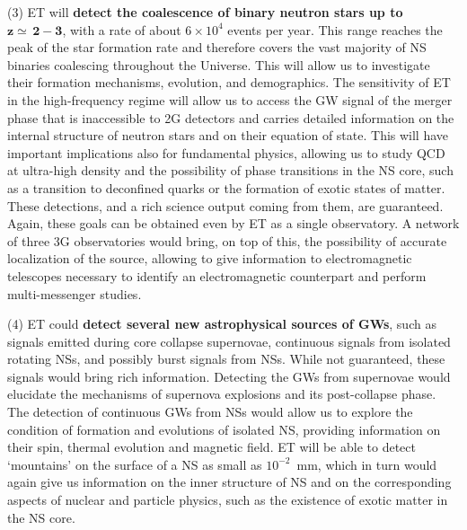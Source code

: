 (3) ET will \textbf{detect the coalescence of binary neutron stars up to} $\mathbf{z\simeq\,2-3}$, with a rate of about $6\times 10^4$ events per year. This range  reaches the peak of the star formation rate and therefore covers the vast majority of NS binaries coalescing throughout the Universe. This will allow us to investigate their formation mechanisms, evolution, and demographics. The sensitivity of ET in the high-frequency regime will allow us to access the GW signal of the merger phase that is inaccessible to 2G detectors and carries detailed information on the internal structure of neutron stars and on their equation of state. This will have  important implications also for fundamental physics, allowing us to study QCD at ultra-high density and  the possibility of phase transitions in the NS core, such as a transition to deconfined quarks or the formation of exotic states of matter. These detections, and a rich science output coming from them, are guaranteed. Again, these goals can be obtained even by ET as a single observatory. A network of three 3G observatories would bring, on top of this, the possibility of accurate localization of the source, allowing to give information to electromagnetic telescopes necessary to identify an electromagnetic counterpart and perform multi-messenger studies.

(4) ET  could \textbf{detect several new astrophysical sources of GWs}, such as signals
emitted during core collapse supernovae, continuous signals from isolated rotating NSs, and possibly burst signals from NSs. While not guaranteed, these signals would bring rich information. Detecting the GWs from supernovae would elucidate the mechanisms of supernova explosions and its post-collapse phase.
The detection of continuous GWs from NSs would allow us to explore the condition of formation and evolutions of isolated NS, providing information on their spin, thermal evolution and magnetic field. ET will be able to detect `mountains' on the surface of a NS as small as $10^{-2}$~mm, which in turn would again give us information on the inner structure of NS and on the corresponding aspects of nuclear and particle physics, such as the existence of exotic matter in the NS core.

